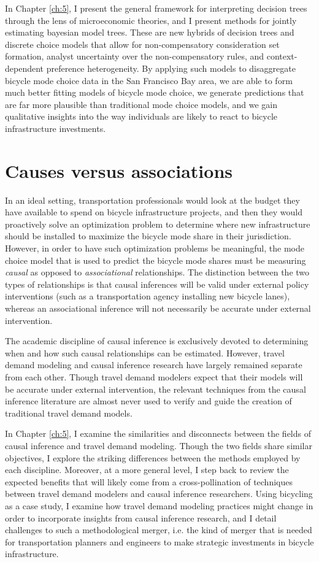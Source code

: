 In Chapter \ref{ch:5}, I present the general framework for interpreting decision trees through the lens of microeconomic theories, and I present methods for jointly estimating bayesian model trees. These are new hybrids of decision trees and discrete choice models that allow for non-compensatory consideration set formation, analyst uncertainty over the non-compensatory rules, and context-dependent preference heterogeneity. By applying such models to disaggregate bicycle mode choice data in the San Francisco Bay area, we are able to form much better fitting models of bicycle mode choice, we generate predictions that are far more plausible than traditional mode choice models, and we gain qualitative insights into the way individuals are likely to react to bicycle infrastructure investments.


\section{Causes versus associations}
\label{sec:causal-biking}
In an ideal setting, transportation professionals would look at the budget they have available to spend on bicycle infrastructure projects, and then they would proactively solve an optimization problem to determine where new infrastructure should be installed to maximize the bicycle mode share in their jurisdiction. However, in order to have such optimization problems be meaningful, the mode choice model that is used to predict the bicycle mode shares must be measuring \textit{causal} as opposed to \textit{associational} relationships. The distinction between the two types of relationships is that causal inferences will be valid under external policy interventions (such as a transportation agency installing new bicycle lanes), whereas an associational inference will not necessarily be accurate under external intervention.

The academic discipline of causal inference is exclusively devoted to determining when and how such causal relationships can be estimated. However, travel demand modeling and causal inference research have largely remained separate from each other. Though travel demand modelers expect that their models will be accurate under external intervention, the relevant techniques from the causal inference literature are almost never used to verify and guide the creation of traditional travel demand models.

In Chapter \ref{ch:5}, I examine the similarities and disconnects between the fields of causal inference and travel demand modeling. Though the two fields share similar objectives, I explore the striking differences between the methods employed by each discipline. Moreover, at a more general level, I step back to review the expected benefits that will likely come from a cross-pollination of techniques between travel demand modelers and causal inference researchers. Using bicycling as a case study, I examine how travel demand modeling practices might change in order to incorporate insights from causal inference research, and I detail challenges to such a methodological merger, i.e. the kind of merger that is needed for transportation planners and engineers to make strategic investments in bicycle infrastructure.

